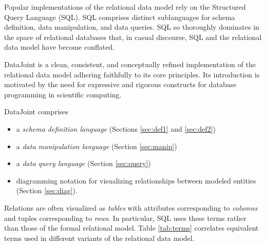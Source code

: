 \documentclass[letter,10pt]{article}
\newcommand{\datajoint}{DataJoint\xspace}
\begin{document}
Popular implementations of the relational data model rely on the Structured Query Language (SQL).
SQL comprises distinct sublanguages for schema definition, data manipulation, and data queries.
SQL so thoroughly dominates in the space of relational databases that, in casual discourse, SQL and the relational data model have become conflated. 

\datajoint is a clean, consistent, and conceptually refined implementation of the relational data model adhering faithfully to its core principles.
Its introduction is motivated by the need for expressive and rigorous  constructs for database programming in scientific computing.

\datajoint comprises 
\begin{itemize}
\item a \emph{schema definition language} (Sections \ref{sec:def1} and \ref{sec:def2})
\item a \emph{data manipulation language} (Section \ref{sec:manip})
\item a \emph{data query language} (Section \ref{sec:query})
\item diagramming notation for visualizing relationships between modeled entities (Section \ref{sec:diag}).
\end{itemize}

Relations are often visualized as \emph{tables} with attributes corresponding to \emph{columns} and tuples corresponding to \emph{rows}.  
In particular, SQL uses these terms rather than those of the formal relational model.  
Table \ref{tab:terms} correlates equivalent terms used in different variants of the relational data model.
\end{document}

